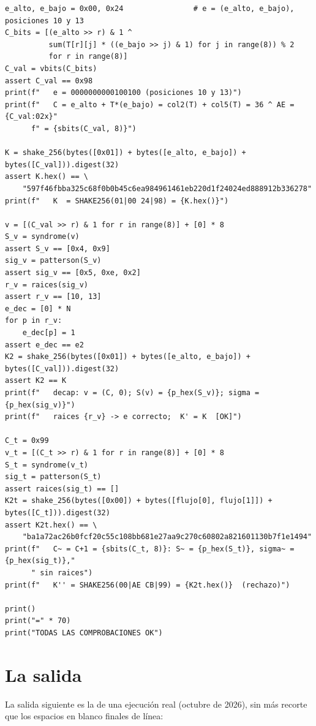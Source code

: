 \documentclass[11pt,a4paper,oneside]{report}
\begin{document}
\begin{lstlisting}
e_alto, e_bajo = 0x00, 0x24                # e = (e_alto, e_bajo), posiciones 10 y 13
C_bits = [(e_alto >> r) & 1 ^
          sum(T[r][j] * ((e_bajo >> j) & 1) for j in range(8)) % 2
          for r in range(8)]
C_val = vbits(C_bits)
assert C_val == 0x98
print(f"   e = 0000000000100100 (posiciones 10 y 13)")
print(f"   C = e_alto + T*(e_bajo) = col2(T) + col5(T) = 36 ^ AE = {C_val:02x}"
      f" = {sbits(C_val, 8)}")

K = shake_256(bytes([0x01]) + bytes([e_alto, e_bajo]) + bytes([C_val])).digest(32)
assert K.hex() == \
    "597f46fbba325c68f0b0b45c6ea984961461eb220d1f24024ed888912b336278"
print(f"   K  = SHAKE256(01|00 24|98) = {K.hex()}")

v = [(C_val >> r) & 1 for r in range(8)] + [0] * 8
S_v = syndrome(v)
assert S_v == [0x4, 0x9]
sig_v = patterson(S_v)
assert sig_v == [0x5, 0xe, 0x2]
r_v = raices(sig_v)
assert r_v == [10, 13]
e_dec = [0] * N
for p in r_v:
    e_dec[p] = 1
assert e_dec == e2
K2 = shake_256(bytes([0x01]) + bytes([e_alto, e_bajo]) + bytes([C_val])).digest(32)
assert K2 == K
print(f"   decap: v = (C, 0); S(v) = {p_hex(S_v)}; sigma = {p_hex(sig_v)}")
print(f"   raices {r_v} -> e correcto;  K' = K  [OK]")

C_t = 0x99
v_t = [(C_t >> r) & 1 for r in range(8)] + [0] * 8
S_t = syndrome(v_t)
sig_t = patterson(S_t)
assert raices(sig_t) == []
K2t = shake_256(bytes([0x00]) + bytes([flujo[0], flujo[1]]) + bytes([C_t])).digest(32)
assert K2t.hex() == \
    "ba1a72ac26b0fcf20c55c108bb681e27aa9c270c60802a821601130b7f1e1494"
print(f"   C~ = C+1 = {sbits(C_t, 8)}: S~ = {p_hex(S_t)}, sigma~ = {p_hex(sig_t)},"
      " sin raices")
print(f"   K'' = SHAKE256(00|AE CB|99) = {K2t.hex()}  (rechazo)")

print()
print("=" * 70)
print("TODAS LAS COMPROBACIONES OK")
\end{lstlisting}

\section{La salida}

La salida siguiente es la de una ejecución real (octubre de 2026),
sin más recorte que los espacios en blanco finales de línea:
\end{document}
